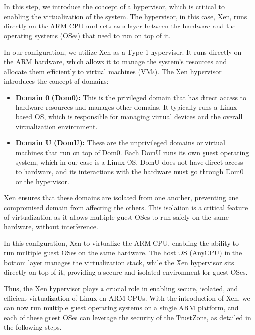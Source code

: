 \documentclass[acmtog]{acmart}
\begin{document}
In this step, we introduce the concept of a hypervisor, which is critical to enabling the virtualization of the system. The hypervisor, in this case, Xen, runs directly on the ARM CPU and acts as a layer between the hardware and the operating systems (OSes) that need to run on top of it. 

In our configuration, we utilize Xen as a Type 1 hypervisor. It runs directly on the ARM hardware, which allows it to manage the system's resources and allocate them efficiently to virtual machines (VMs). The Xen hypervisor introduces the concept of domains: 
\begin{itemize}
    \item \textbf{Domain 0 (Dom0):} This is the privileged domain that has direct access to hardware resources and manages other domains. It typically runs a Linux-based OS, which is responsible for managing virtual devices and the overall virtualization environment.
    \item \textbf{Domain U (DomU):} These are the unprivileged domains or virtual machines that run on top of Dom0. Each DomU runs its own guest operating system, which in our case is a Linux OS. DomU does not have direct access to hardware, and its interactions with the hardware must go through Dom0 or the hypervisor.
\end{itemize}

Xen ensures that these domains are isolated from one another, preventing one compromised domain from affecting the others. This isolation is a critical feature of virtualization as it allows multiple guest OSes to run safely on the same hardware, without interference.

In this configuration, Xen to virtualize the ARM CPU, enabling the ability to run multiple guest OSes on the same hardware. The host OS (AnyCPU) in the bottom layer manages the virtualization stack, while the Xen hypervisor sits directly on top of it, providing a secure and isolated environment for guest OSes.

Thus, the Xen hypervisor plays a crucial role in enabling secure, isolated, and efficient virtualization of Linux on ARM CPUs. With the introduction of Xen, we can now run multiple guest operating systems on a single ARM platform, and each of these guest OSes can leverage the security of the TrustZone, as detailed in the following steps.
\end{document}
